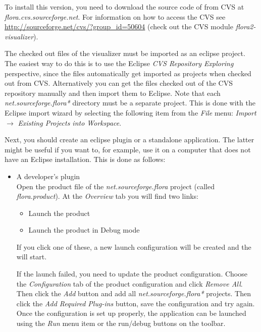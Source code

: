 \begin{enumerate}
  To install this version, you need to download the source
  code of \FVIZ from CVS at \emph{flora.cvs.sourceforge.net}.
  For information on how to access the \FLORA CVS see
  \url{http://sourceforge.net/cvs/?group_id=50604}
  (check out the CVS module {\em flora2-visualizer}).

  The checked out files of the visualizer must be imported as an eclipse
  project.  The easiest way to do this is to use the Eclipse \emph{CVS
    Repository Exploring} perspective, since the files automatically get
  imported as projects when checked out from CVS.  Alternatively you can
  get the files checked out of the CVS repository manually and then import
  them to Eclipse.  Note that each \emph{net.sourceforge.flora*} directory
  must be a separate project. This is done with the Eclipse import wizard
  by selecting the following item from the \emph{File} menu:
  \emph{Import} $\rightarrow$ \emph{Existing Projects into Workspace}.

  Next, you should create an eclipse plugin or a standalone
  application. The latter might be useful if you want to, for example, use
  it on a computer that does not have an Eclipse installation.
  This is done as follows:
\begin{itemize}
\item A developer's plugin\\
  Open the product file of the
  \emph{net.sourceforge.flora} project (called \emph{flora.product}).
  At the \emph{Overview} tab you will find two links:
  \begin{itemize}
  \item Launch the product
  \item Launch the product in Debug mode
  \end{itemize}
  If you click one of these, a new launch configuration will be created and
  the \FVIZ will start.

  If the launch failed, you need to update the product
  configuration. Choose the \emph{Configuration} tab of the product
  configuration and click \emph{Remove All}. Then click the \emph{Add}
  button and add all \emph{net.sourceforge.flora*} projects. Then click the
  \emph{Add Required Plug-ins} button, save the configuration and try
  again.  Once the configuration is set up properly, the application can be
  launched using the \emph{Run} menu item or the run/debug buttons on the
  toolbar.


\end{itemize}
\end{enumerate}
